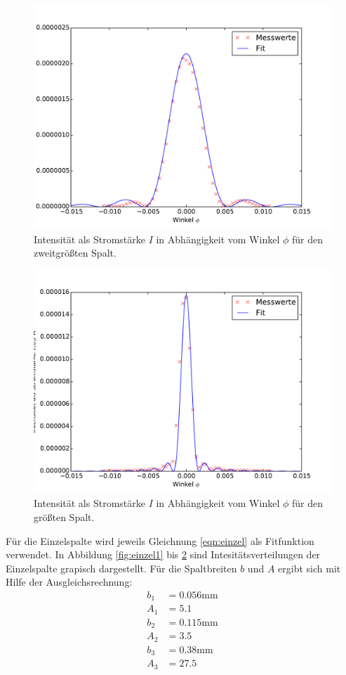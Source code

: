 \begin{figure}
  \centering
  \includegraphics[scale=0.6]{auswertung/einzel2.pdf}
  \caption{Intensität als Stromstärke $I$ in Abhängigkeit vom Winkel $\phi$ für den zweitgrößten Spalt.}
  \label{fig:einzel2}
\end{figure}

\begin{figure}
  \centering
  \includegraphics[scale=0.6]{auswertung/einzel3.pdf}
  \caption{Intensität als Stromstärke $I$ in Abhängigkeit vom Winkel $\phi$ für den größten Spalt.}
  \label{fig:einzel3}
\end{figure}

Für die Einzelspalte wird jeweils Gleichnung \ref{eqn:einzel} als Fitfunktion verwendet. In Abbildung \ref{fig:einzel1} bis \ref{fig:einzel3} sind Intesitätsverteilungen der Einzelspalte grapisch dargestellt.
Für die Spaltbreiten $b$ und $A$ ergibt sich mit Hilfe der Ausgleichsrechnung:
\begin{align}
  b_1 &= 0.056 \si{\milli\meter} \\
  A_1 &= 5.1 \\
  b_2 &= 0.115 \si{\milli\meter}\\
  A_2 &= 3.5 \\
  b_3 &= 0.38 \si{\milli\meter} \\
  A_3 &= 27.5 \\
\end{align}

